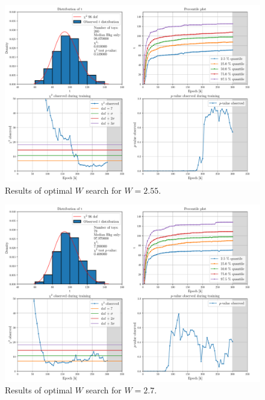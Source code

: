 \begin{figure}[H]
	\centering
	\includegraphics[width=1.0\textwidth]{Python/W_CLIP/ref500000_bkg20000_sig0/data_ref500000_bkg20000_sig0_wclip2-55.pdf}
	\caption{Results of optimal $W$ search for $W=2.55$.}
	\label{fig:REF500000_BKG20000_SIG0_WCLIP2.55}
\end{figure}
\vspace{-5mm}
\begin{figure}[H]
	\centering
	\includegraphics[width=1.0\textwidth]{Python/W_CLIP/ref1000000_bkg20000_sig0/data_ref1000000_bkg20000_sig0_wclip2-7.pdf}
	\caption{Results of optimal $W$ search for $W=2.7$.}
	\label{fig:REF1000000_BKG20000_SIG0_WCLIP2.7}
\end{figure}